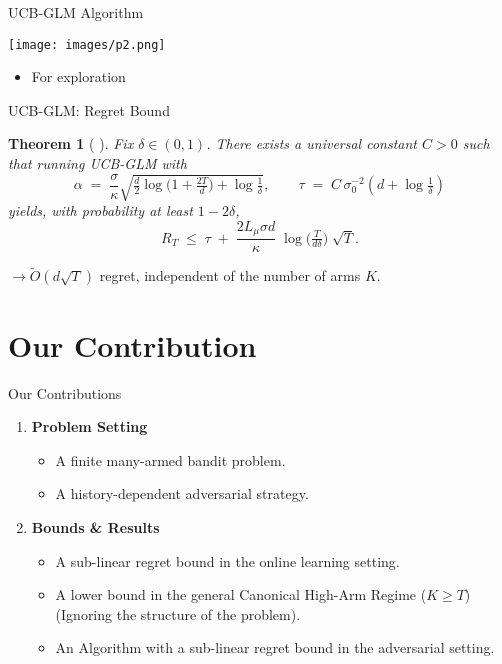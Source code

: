 \documentclass{beamer}
\newtheorem{thm}{Theorem}
\begin{document}
\begin{frame}{UCB-GLM Algorithm \cite{li2017provablyoptimalalgorithmsgeneralized}}
  \begin{center}
    \texttt{[image: images/p2.png]}
  \end{center}
  \begin{itemize}
    \item For exploration
\end{itemize}
\end{frame}

\begin{frame}{UCB-GLM: Regret Bound}
    \begin{thm}[ ]
  Fix $\delta\in(0,1)$. There exists a universal constant $C>0$ such that running UCB-GLM with
  \[
    \alpha \;=\; \frac{\sigma}{\kappa}\sqrt{\tfrac{d}{2}\log\!\big(1+\tfrac{2T}{d}\big)+\log\!\tfrac{1}{\delta}},
    \qquad
    \tau \;=\; C\,\sigma_0^{-2}\!\left(d+\log\!\tfrac{1}{\delta}\right)
  \]
  yields, with probability at least $1-2\delta$,
  \[
    R_T \;\le\; \tau \;+\; \frac{2L_\mu \sigma d}{\kappa}\;
      \log\!\Big(\tfrac{T}{d\delta}\Big)\;\sqrt{T}.
  \]
\end{thm}
  \vspace{0.6em}
   $\rightarrow \tilde{O}(d\sqrt{T})$ regret, independent of the number of arms $K$.
  
\end{frame}


\section{Our Contribution}

\begin{frame}{Our Contributions}
    \begin{enumerate}
        \item \textbf{Problem Setting}
        \begin{itemize}
            \item A finite many-armed bandit problem.
            \item A history-dependent adversarial strategy.
        \end{itemize}
    \item \textbf{Bounds \& Results}
          \begin{itemize}
            \item A sub-linear regret bound in the online learning setting.
            \item A lower bound in the general Canonical High-Arm Regime ($K \ge T$) (Ignoring the structure of the problem).
            \item An Algorithm with a sub-linear regret bound in the adversarial setting.
          \end{itemize}

    \end{enumerate}
\end{frame}
\end{document}
